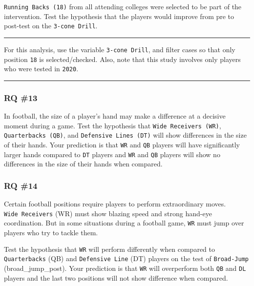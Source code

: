 \documentclass[
]{article}
\begin{document}
\texttt{Running\ Backs\ (18)} from all attending colleges were selected to be part of the intervention. Test the hypothesis that the players would improve from pre to post-test on the \texttt{3-cone\ Drill}.

\begin{center}\rule{0.5\linewidth}{0.5pt}\end{center}

For this analysis, use the variable \texttt{3-cone\ Drill}, and filter cases so that only position \texttt{18} is selected/checked. Also, note that this study involves only players who were tested in \texttt{2020}.

\begin{center}\rule{0.5\linewidth}{0.5pt}\end{center}

\hypertarget{rq-13}{%
\subsubsection{RQ \#13}\label{rq-13}}

In football, the size of a player's hand may make a difference at a decisive moment during a game. Test the hypothesis that \texttt{Wide\ Receivers\ (WR)}, \texttt{Quarterbacks\ (QB)}, and \texttt{Defensive\ Lines\ (DT)} will show differences in the size of their hands. Your prediction is that \texttt{WR} and \texttt{QB} players will have significantly larger hands compared to \texttt{DT} players and \texttt{WR} and \texttt{QB} players will show no differences in the size of their hands when compared.

\hypertarget{rq-14}{%
\subsubsection{RQ \#14}\label{rq-14}}

Certain football positions require players to perform extraordinary moves. \texttt{Wide\ Receivers} (WR) must show blazing speed and strong hand-eye coordination. But in some situations during a football game, \texttt{WR} must jump over players who try to tackle them.

Test the hypothesis that \texttt{WR} will perform differently when compared to \texttt{Quarterbacks} (QB) and \texttt{Defensive\ Line} (DT) players on the test of \texttt{Broad-Jump} (broad\_jump\_post). Your prediction is that \texttt{WR} will overperform both \texttt{QB} and \texttt{DL} players and the last two positions will not show difference when compared.
\end{document}

